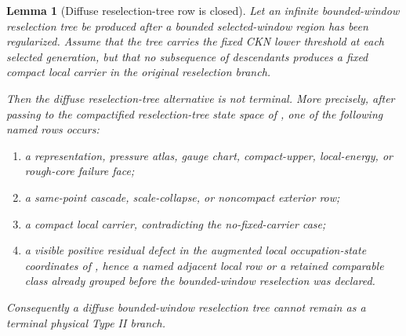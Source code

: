 \documentclass[11pt]{amsart}
\theoremstyle{plain}
\newtheorem{lemma}[lemma]{Lemma}
\theoremstyle{definition}
\theoremstyle{remark}
\begin{document}
\begin{lemma}[Diffuse reselection-tree row is closed]
\label{paper10:lem:diffuse-reselection-tree-row-closed}
Let an infinite bounded-window reselection tree be produced after a bounded
selected-window region has been regularized.  Assume that the tree carries the
fixed CKN lower threshold at each selected generation, but that no subsequence
of descendants produces a fixed compact local carrier in the original
reselection branch.

Then the diffuse reselection-tree alternative is not terminal.  More precisely,
after passing to the compactified reselection-tree state space of
, one of the following
named rows occurs:
\begin{enumerate}[label=\textup{(\roman*)}]
\item a representation, pressure atlas, gauge chart, compact-upper,
  local-energy, or rough-core failure face;
\item a same-point cascade, scale-collapse, or noncompact exterior row;
\item a compact local carrier, contradicting the no-fixed-carrier case;
\item a visible positive residual defect in the augmented local occupation-state
  coordinates of , hence a
  named adjacent local row or a retained comparable class already grouped
  before the bounded-window reselection was declared.
\end{enumerate}
Consequently a diffuse bounded-window reselection tree cannot remain as a
terminal physical Type II branch.
\end{lemma}
\end{document}
